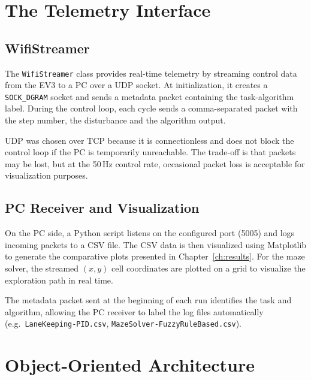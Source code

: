 \section{The Telemetry Interface}
\label{sec:ui}

\subsection{WifiStreamer}
\label{sec:wifi-streamer}

The \texttt{WifiStreamer} class provides real-time telemetry by streaming control data from the EV3 to a PC over a UDP socket. At initialization, it creates a \texttt{SOCK\_DGRAM} socket and sends a metadata packet containing the task-algorithm label. During the control loop, each cycle sends a comma-separated packet with the step number, the disturbance and the algorithm output.

UDP was chosen over TCP because it is connectionless and does not block the control loop if the PC is temporarily unreachable. The trade-off is that packets may be lost, but at the 50\,Hz control rate, occasional packet loss is acceptable for visualization purposes.

\subsection{PC Receiver and Visualization}
\label{sec:pc-receiver}

On the PC side, a Python script listens on the configured port (5005) and logs incoming packets to a CSV file. The CSV data is then visualized using Matplotlib to generate the comparative plots presented in Chapter~\ref{ch:results}. For the maze solver, the streamed $(x, y)$ cell coordinates are plotted on a grid to visualize the exploration path in real time.

The metadata packet sent at the beginning of each run identifies the task and algorithm, allowing the PC receiver to label the log files automatically (e.g.\ \texttt{LaneKeeping-PID.csv}, \texttt{MazeSolver-FuzzyRuleBased.csv}).


\section{Object-Oriented Architecture}
\label{sec:oop}

